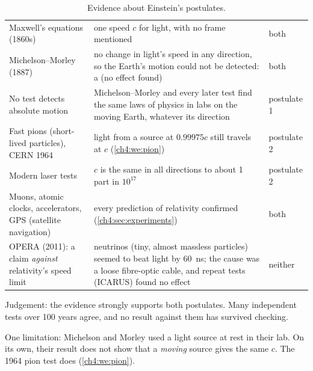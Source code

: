 \begin{table}
  \caption{Evidence about Einstein's postulates.}\label{ch4:tab:evidence}
  \centering\small
  \begin{tabular}{@{}L{36mm}L{78mm}L{20mm}@{}}
    \toprule
     &  & \\
    \midrule
    Maxwell's equations (1860s) & one speed $c$ for light, with no frame mentioned & both\\
    Michelson--Morley (1887) & no change in light's speed in any direction, so the Earth's
      motion could not be detected: a  (no effect found) & both\\
    No test detects absolute motion & Michelson--Morley and every later test find the same laws
      of physics in labs on the moving Earth, whatever its direction & postulate 1\\
    Fast pions (short-lived particles), CERN 1964 & light from a source at $0.99975c$ still
      travels at $c$ (\cref{ch4:we:pion}) & postulate 2\\
    Modern laser tests & $c$ is the same in all directions to about 1 part in $10^{17}$ & postulate 2\\
    Muons, atomic clocks, accelerators, GPS (satellite navigation) & every prediction of
      relativity confirmed (\cref{ch4:sec:experiments}) & both\\
    OPERA (2011): a claim \emph{against} relativity's speed limit & neutrinos (tiny, almost
      massless particles) seemed to beat light by \qty{60}{ns}; the cause was a loose
      fibre-optic cable, and repeat tests (ICARUS) found no effect & neither\\
    \bottomrule
  \end{tabular}
\end{table}

Judgement: the evidence strongly supports both postulates. Many independent tests over 100
years agree, and no result against them has survived checking.

One limitation: Michelson and Morley used a light source at rest in their lab. On its own, their
result does not show that a \emph{moving} source gives the same $c$. The 1964 pion test does
(\cref{ch4:we:pion}).

